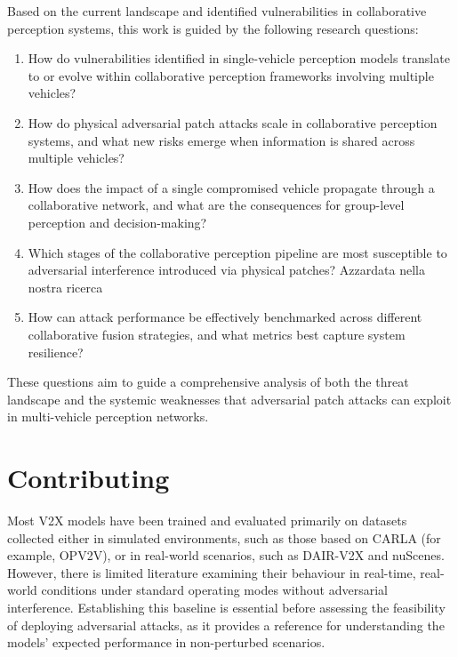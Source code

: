 Based on the current landscape and identified vulnerabilities in collaborative perception systems, this work is guided by the following research questions:
\begin{enumerate}
    \item How do vulnerabilities identified in single-vehicle perception models translate to or evolve within collaborative perception frameworks involving multiple vehicles?
    \item How do physical adversarial patch attacks scale in collaborative perception systems, and what new risks emerge when information is shared across multiple vehicles?
    \item How does the impact of a single compromised vehicle propagate through a collaborative network, and what are the consequences for group-level perception and decision-making?
    \item Which stages of the collaborative perception pipeline are most susceptible to adversarial interference introduced via physical patches? Azzardata nella nostra ricerca
    \item How can attack performance be effectively benchmarked across different collaborative fusion strategies, and what metrics best capture system resilience?
\end{enumerate}
These questions aim to guide a comprehensive analysis of both the threat landscape and the systemic weaknesses that adversarial patch attacks can exploit in multi-vehicle perception networks.

\section{Contributing}

Most V2X models have been trained and evaluated primarily on datasets collected either in simulated environments, such as those based on CARLA (for example, OPV2V\cite{xu2022opv2vopenbenchmarkdataset}), or in real-world scenarios, such as DAIR-V2X\cite{DAIR-V2X2021} and nuScenes\cite{nuscenes2019}.
However, there is limited literature examining their behaviour in real-time, real-world conditions under standard operating modes without adversarial interference.
Establishing this baseline is essential before assessing the feasibility of deploying adversarial attacks, as it provides a reference for understanding the models’ expected performance in non-perturbed scenarios.

